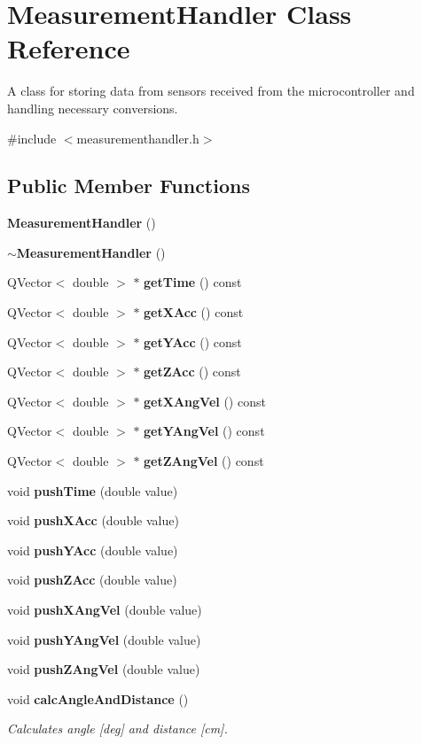 \section{Measurement\+Handler Class Reference}
\label{class_measurement_handler}


A class for storing data from sensors received from the microcontroller and handling necessary conversions.  




{\ttfamily \#include $<$measurementhandler.\+h$>$}

\subsection*{Public Member Functions}
\begin{DoxyCompactItemize}
\item 
\textbf{ Measurement\+Handler} ()
\item 
\textbf{ $\sim$\+Measurement\+Handler} ()
\item 
Q\+Vector$<$ double $>$ $\ast$ \textbf{ get\+Time} () const
\item 
Q\+Vector$<$ double $>$ $\ast$ \textbf{ get\+X\+Acc} () const
\item 
Q\+Vector$<$ double $>$ $\ast$ \textbf{ get\+Y\+Acc} () const
\item 
Q\+Vector$<$ double $>$ $\ast$ \textbf{ get\+Z\+Acc} () const
\item 
Q\+Vector$<$ double $>$ $\ast$ \textbf{ get\+X\+Ang\+Vel} () const
\item 
Q\+Vector$<$ double $>$ $\ast$ \textbf{ get\+Y\+Ang\+Vel} () const
\item 
Q\+Vector$<$ double $>$ $\ast$ \textbf{ get\+Z\+Ang\+Vel} () const
\item 
void \textbf{ push\+Time} (double value)
\item 
void \textbf{ push\+X\+Acc} (double value)
\item 
void \textbf{ push\+Y\+Acc} (double value)
\item 
void \textbf{ push\+Z\+Acc} (double value)
\item 
void \textbf{ push\+X\+Ang\+Vel} (double value)
\item 
void \textbf{ push\+Y\+Ang\+Vel} (double value)
\item 
void \textbf{ push\+Z\+Ang\+Vel} (double value)
\item 
void \textbf{ calc\+Angle\+And\+Distance} ()
\begin{DoxyCompactList}\small\item\em Calculates angle [deg] and distance [cm]. \end{DoxyCompactList}\item 

\end{DoxyCompactItemize}

